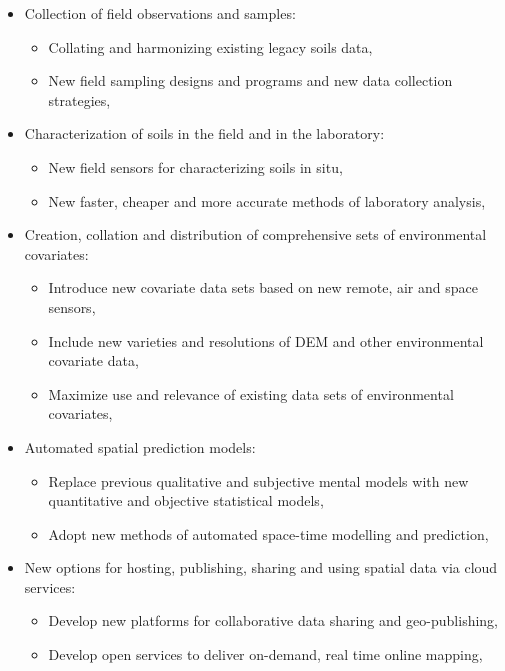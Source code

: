 \documentclass[graybox,natbib,nospthms,UStrade]{svmono}
\begin{document}
\begin{itemize}
\item
  Collection of field observations and samples:

  \begin{itemize}
  \item
    Collating and harmonizing existing legacy soils data,
  \item
    New field sampling designs and programs and new data collection
    strategies,
  \end{itemize}
\item
  Characterization of soils in the field and in the laboratory:

  \begin{itemize}
  \item
    New field sensors for characterizing soils in situ,
  \item
    New faster, cheaper and more accurate methods of laboratory
    analysis,
  \end{itemize}
\item
  Creation, collation and distribution of comprehensive sets of
  environmental covariates:

  \begin{itemize}
  \item
    Introduce new covariate data sets based on new remote, air and
    space sensors,
  \item
    Include new varieties and resolutions of DEM and other
    environmental covariate data,
  \item
    Maximize use and relevance of existing data sets of
    environmental covariates,
  \end{itemize}
\item
  Automated spatial prediction models:

  \begin{itemize}
  \item
    Replace previous qualitative and subjective mental models with
    new quantitative and objective statistical models,
  \item
    Adopt new methods of automated space-time modelling and
    prediction,
  \end{itemize}
\item
  New options for hosting, publishing, sharing and using spatial data
  via cloud services:

  \begin{itemize}
  \item
    Develop new platforms for collaborative data sharing and
    geo-publishing,
  \item
    Develop open services to deliver on-demand, real time online
    mapping,
  \end{itemize}
\end{itemize}
\end{document}
